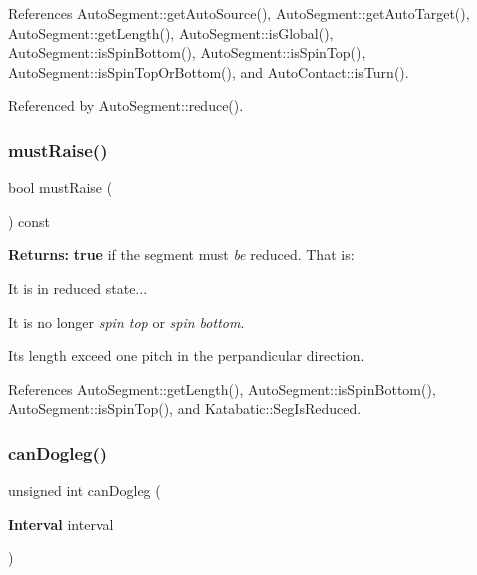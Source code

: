 References Auto\+Segment\+::get\+Auto\+Source(), Auto\+Segment\+::get\+Auto\+Target(), Auto\+Segment\+::get\+Length(), Auto\+Segment\+::is\+Global(), Auto\+Segment\+::is\+Spin\+Bottom(), Auto\+Segment\+::is\+Spin\+Top(), Auto\+Segment\+::is\+Spin\+Top\+Or\+Bottom(), and Auto\+Contact\+::is\+Turn().



Referenced by Auto\+Segment\+::reduce().

\mbox{\label{classKatabatic_1_1AutoSegment_a449ebb156fd51b04bbc029a657b4cded}} 
\subsubsection{\texorpdfstring{must\+Raise()}{mustRaise()}}
{\footnotesize\ttfamily bool must\+Raise (\begin{DoxyParamCaption}{ }\end{DoxyParamCaption}) const}

{\bfseries Returns\+:} {\bfseries true} if the segment must {\itshape be} reduced. That is\+:
\begin{DoxyItemize}
\item It is in reduced state...
\item It is no longer {\itshape spin top} or {\itshape spin bottom}.
\item It\textquotesingle{}s length exceed one pitch in the perpandicular direction. 
\end{DoxyItemize}

References Auto\+Segment\+::get\+Length(), Auto\+Segment\+::is\+Spin\+Bottom(), Auto\+Segment\+::is\+Spin\+Top(), and Katabatic\+::\+Seg\+Is\+Reduced.

\mbox{\label{classKatabatic_1_1AutoSegment_a43c865bcfcfd6132352a9ac8a84c25cd}} 
\subsubsection{\texorpdfstring{can\+Dogleg()}{canDogleg()}}
{\footnotesize\ttfamily unsigned int can\+Dogleg (\begin{DoxyParamCaption}\item[{\textbf{ Interval}}]{interval }\end{DoxyParamCaption})}

